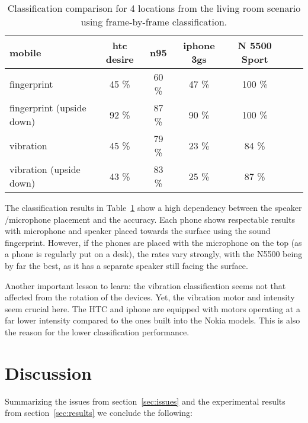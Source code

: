 \begin{table}[ht]
\caption[Smartphone classification comparison]{Classification comparison for 4 locations from the living
 room scenario using frame-by-frame classification.}
\label{table:depend}
\begin{tabularx}{\textwidth+10pt }{lcccccc}
\toprule
mobile & htc desire &n95 &iphone 3gs& N 5500 Sport\\
\midrule
fingerprint & 45 \% & 60 \% & 47 \% & 100 \%\\
fingerprint (upside down) & 92 \% & 87 \% & 90 \% & 100 \% \\
vibration & 45 \% & 79 \% & 23 \% & 84 \% \\
vibration (upside down) & 43 \% & 83 \% & 25 \% & 87 \% \\
\bottomrule
\end{tabularx}
\end{table}

The classification results in Table~\ref{table:depend} show a high
dependency between the speaker /microphone placement and the
accuracy. Each phone shows respectable results with microphone and
speaker placed towards the surface using the sound fingerprint.
However, if the phones are placed with the microphone on the top (as a
phone is regularly put on a desk), the rates vary strongly, with the
N5500 being by far the best, as it has a separate speaker still facing
the surface.

Another important lesson to learn: the vibration classification seems
not that affected from the rotation of the devices. Yet, the vibration
motor and intensity seem crucial here. The HTC and iphone are
equipped with motors operating at a far lower intensity compared to
the ones built into the Nokia models. This is also the reason for the
lower classification performance.


\section{Discussion}
 
Summarizing the issues from section~\ref{sec:issues} and the
experimental results from section~\ref{sec:results} we conclude the
following:

